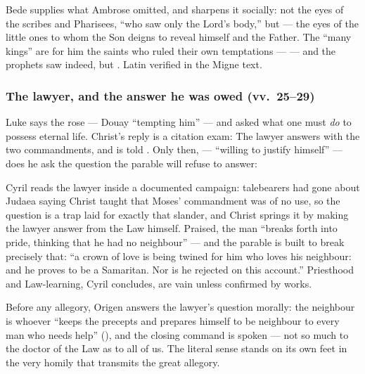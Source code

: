 \begin{witnessnote}
Bede supplies what Ambrose omitted, and sharpens it socially: not the eyes of
the scribes and Pharisees, ``who saw only the Lord's body,'' but  --- the eyes of the little ones to whom the Son deigns to
reveal himself and the Father. The ``many kings'' are for him the saints who
ruled their own temptations ---  --- and the prophets saw indeed, but
. Latin verified in the Migne text.
\end{witnessnote}

\subsubsection*{The lawyer, and the answer he was owed (vv.~25--29)}

Luke says the  rose  --- Douay
``tempting him'' --- and asked what one must \textit{do} to possess eternal
life. Christ's reply is a citation exam:  The lawyer answers with the two commandments, and is told
. Only then,  --- ``willing to justify himself'' --- does he ask the
question the parable will refuse to answer: 

\begin{witnessnote}
Cyril reads the lawyer inside a documented campaign: talebearers had gone
about Judaea saying Christ taught that Moses' commandment was of no use, so
the question is a trap laid for exactly that slander, and Christ springs it by
making the lawyer answer from the Law himself. Praised, the man ``breaks forth
into pride, thinking that he had no neighbour'' --- and the parable is built
to break precisely that: ``a crown of love is being twined for him who loves
his neighbour: and he proves to be a Samaritan. Nor is he rejected on this
account.'' Priesthood and Law-learning, Cyril concludes, are vain unless
confirmed by works.
\end{witnessnote}

\begin{witnessnote}
Before any allegory, Origen answers the lawyer's question morally: the
neighbour is whoever ``keeps the precepts and prepares himself to be neighbour
to every man who needs help'' (), and the closing command is spoken  --- not so much to the doctor of the
Law as to all of us. The literal sense stands on its own feet in the very
homily that transmits the great allegory.
\end{witnessnote}

